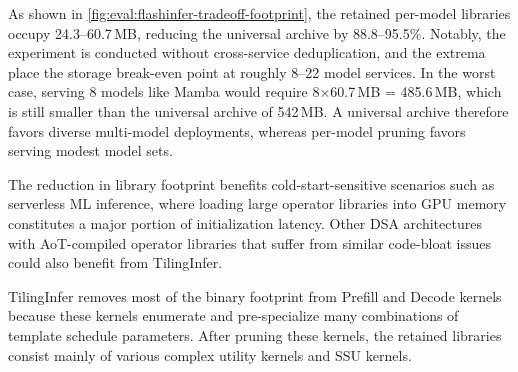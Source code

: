 {\color{blue}%
As shown in \autoref{fig:eval:flashinfer-tradeoff-footprint}, the retained per-model libraries occupy 24.3--60.7\,MB, reducing the universal archive by 88.8--95.5\%. Notably, the experiment is conducted without cross-service deduplication, and the extrema place the storage break-even point at roughly 8--22 model services. In the worst case, serving 8 models like Mamba would require 8$\times$60.7\,MB = 485.6\,MB, which is still smaller than the universal archive of 542\,MB. A universal archive therefore favors diverse multi-model deployments, whereas per-model pruning favors serving modest model sets.
\par}

{\color{blue}%
The reduction in library footprint benefits cold-start-sensitive scenarios such as serverless ML inference, where loading large operator libraries into GPU memory constitutes a major portion of initialization latency. Other DSA architectures with AoT-compiled operator libraries that suffer from similar code-bloat issues could also benefit from TilingInfer.
\par}

{\color{blue}%
TilingInfer removes most of the binary footprint from Prefill and Decode kernels because these kernels enumerate and pre-specialize many combinations of template schedule parameters. After pruning these kernels, the retained libraries consist mainly of various complex utility kernels and SSU kernels.
\par}
